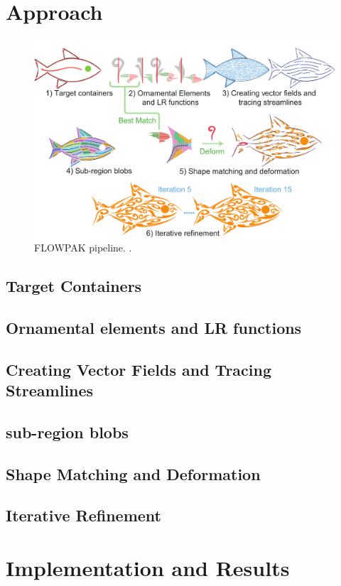 \section{Approach}

\begin{figure}
\centering
\includegraphics[width=1.0\textwidth]{figures/flowpak/pipeline.pdf} 
\caption{\label{fig_flowpak_pipeline} 
FLOWPAK pipeline. .}
\end{figure}

\subsection{Target Containers}
\subsection{Ornamental elements and LR functions}
\subsection{Creating Vector Fields and Tracing Streamlines}
\subsection{sub-region blobs}
\subsection{Shape Matching and Deformation}
\subsection{Iterative Refinement}
\section{Implementation and Results}

